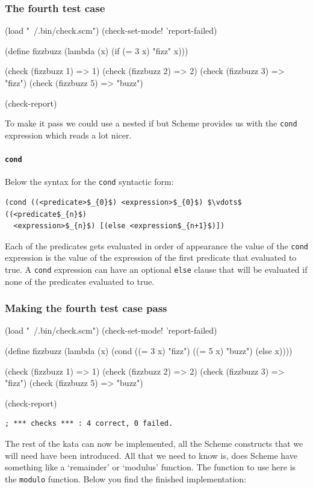 \documentclass[12pt,a4paper,english,twoside]{article}
\begin{document}
\subsubsection{The fourth test case}
\begin{schemecode}
(load "~/.bin/check.scm")
(check-set-mode! 'report-failed)

(define fizzbuzz 
  (lambda (x) 
    (if (= 3 x) "fizz" x)))

(check (fizzbuzz 1) => 1)
(check (fizzbuzz 2) => 2)
(check (fizzbuzz 3) => "fizz")
(check (fizzbuzz 5) => "buzz")

(check-report)
\end{schemecode}
To make it pass we could use a nested if but Scheme provides us with the 
\texttt{cond} expression which reads a lot nicer.
\paragraph{\texttt{cond}}
Below the syntax for the \texttt{cond} syntactic form:
\begin{lstlisting}[mathescape]
  (cond ((<predicate>$_{0}$) <expression>$_{0}$) $\vdots$ ((<predicate$_{n}$) 
  <expression>$_{n}$) [(else <expression$_{n+1}$)])
\end{lstlisting}
Each of the predicates gets evaluated in order of appearance the value of the 
\texttt{cond} expression is the value of the expression of the first predicate 
that evaluated to true. A \texttt{cond} expression can have an optional 
\texttt{else} clause that will be evaluated if none of the predicates 
evaluated to true.
\subsubsection{Making the fourth test case pass}
\begin{schemecode}
(load "~/.bin/check.scm")
(check-set-mode! 'report-failed)

(define fizzbuzz 
  (lambda (x) 
    (cond ((= 3 x) "fizz")
          ((= 5 x) "buzz")
          (else x))))

(check (fizzbuzz 1) => 1)
(check (fizzbuzz 2) => 2)
(check (fizzbuzz 3) => "fizz")
(check (fizzbuzz 5) => "buzz")

(check-report)
\end{schemecode}
\begin{lstlisting}
; *** checks *** : 4 correct, 0 failed.  
\end{lstlisting}
The rest of the kata can now be implemented, all the Scheme constructs that we 
will need have been introduced. All that we need to know is, does Scheme have 
something like a `remainder' or `modulus' function. The function to use here 
is the \texttt{modulo} function. Below you find the finished implementation:
\end{document}

